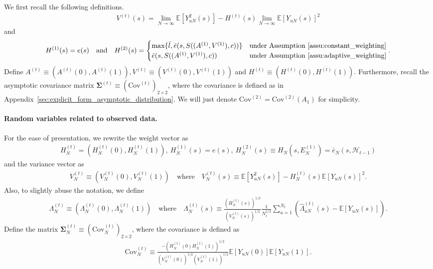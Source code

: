 \documentclass[12pt]{article}
\newcommand{\E}{\mathbb E}								%
\begin{document}
We first recall the following definitions.
\begin{align}\label{eq:V_2_def}
	V^{(t)}(s)= \lim_{N\rightarrow\infty}\E[Y_{uN}^2(s)]-H^{(t)}(s)\lim_{N\rightarrow\infty}\E[Y_{uN}(s)]^2
\end{align}
and 
\small
\begin{align}\label{eq:H_N_def}
	H^{(1)}(s)= e(s)\quad\text{and}\quad H^{(2)}(s)= 
	\begin{cases}
		\max\{\bar l, \bar e(s,S((A^{(1)},V^{(1)}),c))\} & \text{under Assumption \ref{assu:constant_weighting}}\\
		\bar e(s,S((A^{(1)},V^{(1)}),c)) & \text{under Assumption \ref{assu:adaptive_weighting}}
	\end{cases}.
\end{align}
\normalsize 
Define $A^{(t)} \equiv (A^{(t)}(0),A^{(t)}(1)),V^{(t)}\equiv (V^{(t)}(0),V^{(t)}(1))$ and $H^{(t)}\equiv (H^{(t)}(0),H^{(t)}(1))$. Furthermore, recall the asymptotic covariance matrix $\bm \Sigma^{(t)}\equiv (\mathrm{Cov}^{(t)})_{2\times 2}$, where the covariance is defined as in Appendix~\ref{sec:explicit_form_asymptotic_distribution}. We will just denote $\mathrm{Cov}^{(2)}=\mathrm{Cov}^{(2)}(A_1)$ for simplicity.

\paragraph{Random variables related to observed data.}

For the ease of presentation, we rewrite the weight vector as
\begin{align*}
	H_N^{(t)}=(H_N^{(t)}(0),H_N^{(t)}(1)),\ H_N^{(1)}(s)=e(s),\ H_N^{(2)}(s)\equiv H_N(s, E_N^{(1)})=\bar e_N(s,\mathcal{H}_{t-1})
\end{align*}
and the variance vector as
\begin{align*}
	V_{N}^{(t)}\equiv (V_{N}^{(t)}(0),V_{N}^{(t)}(1))\quad\text{where}\quad V_N^{(t)}(s)\equiv \E[Y_{uN}^2(s)]-H_N^{(t)}(s)\E[Y_{uN}(s)]^2.
\end{align*}
Also, to slightly abuse the notation, we define
\begin{align*}
	\Lambda_{N}^{(t)}\equiv (\Lambda_{N}^{(t)}(0),\Lambda_{N}^{(t)}(1))\quad\text{where}\quad\Lambda_N^{(t)}(s)\equiv \frac{(H_N^{(t)}(s))^{1/2}}{(V_{N}^{(t)}(s))^{1/2}}\frac{1}{N_t^{1/2}}\sum_{u=1}^{N_t}(\hat{\Lambda}_{uN}^{(t)}(s)-\E[Y_{uN}(s)]).
\end{align*}
Define the matrix $\bm \Sigma_N^{(t)}\equiv (\mathrm{Cov}_N^{(t)})_{2\times 2}$, where the covariance is defined as
\begin{align}\label{eq:sigma_N_E_1n_def}
	\mathrm{Cov}_N^{(t)}\equiv \frac{-(H_N^{(t)}(0)H_N^{(t)}(1))^{1/2}}{(V_{N}^{(t)}(0))^{1/2}(V_{N}^{(t)}(1))^{1/2}}\E[Y_{uN}(0)]\E[Y_{uN}(1)].
\end{align}
\end{document}
